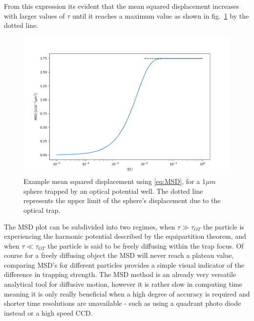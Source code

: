 From this expression its evident that the mean squared displacement 
increases with larger values of $\tau$ until it reaches a maximum 
value as shown in fig.~\ref{fig:MSD} by the dotted line.
\begin{figure}[h!]
	\centering
	\includegraphics[width=\linewidth]{MSD.png}
	\caption{Example mean squared displacement using \eqref{eq:MSD}, 
		for a $1\mu m$ sphere trapped by an optical potential well. 
		The dotted line represents the upper limit of the sphere's 
		displacement due to the optical trap.}
	\label{fig:MSD}
\end{figure}

The MSD plot can be subdivided into two regimes, when $\tau \gg \tau_{OT}$ 
the particle is experiencing the harmonic potential described by 
the equipartition theorem, and when $\tau \ll \tau_{OT}$ the particle 
is said to be freely diffusing within the trap focus. Of course for 
a freely diffusing object the MSD will never reach a plateau value, 
comparing MSD's for different particles provides a simple visual 
indicator of the difference in trapping strength. The MSD method is 
an already very versatile analytical tool for diffusive motion, however 
it is rather slow in computing time meaning it is only really beneficial 
when a high degree of accuracy is required and shorter time resolutions 
are unavailable - such as using a quadrant photo diode instead or a high 
speed CCD.

